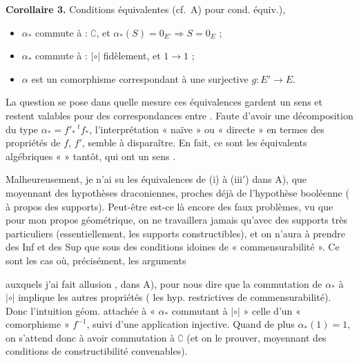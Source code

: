 \documentclass[11pt,a4paper]{article}
\begin{document}
\textbf{Corollaire 3.} Conditions équivalentes (cf.\ A) pour cond. équiv.),
\begin{itemize}
  \item[(i)] $\alpha_*$ commute à : $\complement$, et $\alpha_*(S) = 0_{E'} \Rightarrow S = 0_E$ ;
  \item[(ii)] $\alpha_*$ commute à : $\mathbin{|\circ|}$ fidèlement, et $1 \to 1$ ;
  \item[(iii)] $\alpha$ est un comorphisme correspondant à une  surjective $g\colon E' \to E$.
\end{itemize}

La question se pose dans quelle mesure ces équivalences  gardent un sens et restent valables pour des correspondances entre  . Faute d'avoir une décomposition du type $\alpha_* = f'_*\,{}^t\!f_*$,  l'interprétation « naïve » ou « directe » en termes des propriétés de $f$, $f'$, \struck{\ill{}} semble  à disparaître. En fait, ce sont les équivalents algébriques «  » tantôt, qui ont un sens .

Malheureusement, je n'ai su   les équivalences de (i) à (iii$'$) dans A), que moyennant des hypothèses draconiennes, proches déjà de l'hypothèse booléenne (\ill{} à propos des supports). Peut-être est-ce là encore des faux problèmes, vu que pour mon propos géométrique, on ne travaillera jamais qu'avec des supports très particuliers (essentiellement, les supports constructibles), et on n'aura à prendre des Inf et des Sup que sous des conditions idoines de « commensurabilité ». Ce sont les cas où, précisément, les arguments

auxquels j'ai fait allusion , dans A), pour nous dire que la commutation de $\alpha_*$ à $\mathbin{|\circ|}$ implique les autres propriétés ( les hyp. restrictives de commensurabilité). Donc l'intuition géom. attachée à « $\alpha_*$ commutant à $\mathbin{|\circ|}$ »   celle d'un « comorphisme » $f^{-1}$, suivi d'une application injective. Quand de plus $\alpha_*(1) = 1$, on s'attend donc à avoir commutation à $\complement$ (et on  le prouver, moyennant des conditions de constructibilité convenables).
\end{document}
